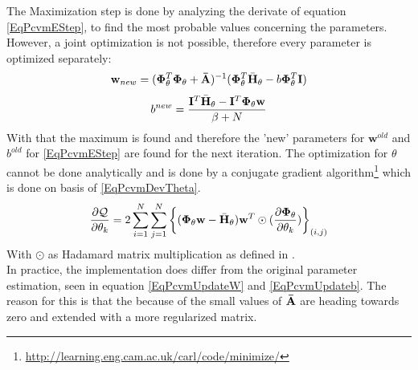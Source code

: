 The Maximization step is done by analyzing the derivate of equation \ref{EqPcvmEStep}, to find the most probable values concerning the parameters.
However, a joint optimization is not possible, therefore every parameter is optimized separately:\cite{Chen.2009}
\begin{equation}\label{EqPcvmUpdateW}
\mathbf{w}_{new} = (\mathbf{\Phi}_\theta^T \mathbf{\Phi}_\theta + \mathbf{\bar{A}})^{-1} (\mathbf{\Phi}_\theta^T \bar{\mathbf{H}}_\theta - b\mathbf{\Phi}_\theta^T \mathbf{I})
\end{equation}
\begin{equation}\label{EqPcvmUpdateb}
b^{new} = \frac{\mathbf{I}^T \bar{\mathbf{H}}_\theta - \mathbf{I}^T \mathbf{\Phi}_\theta \mathbf{w}}{\beta + N}
\end{equation}
With that the maximum is found and therefore the 'new' parameters for $\mathbf{w}^{old}$ and $b^{old}$ for \ref{EqPcvmEStep} are found for the next iteration.
The optimization for $\theta$ cannot be done analytically and is done by a conjugate gradient algorithm\footnote{\url{http://learning.eng.cam.ac.uk/carl/code/minimize/}} which is done on basis of \eqref{EqPcvmDevTheta}.\cite{Chen.2009}
\begin{equation}\label{EqPcvmDevTheta}
\frac{\partial \mathcal{Q}}{\partial \mathbf{\theta}_k } = 2 \sum_{i=1}^{N}\sum_{j=1}^{N} \bigg\{ (\mathbf{\Phi}_\theta \mathbf{w} - \bar{\mathbf{H}}_\theta) \mathbf{w}^T \odot (\frac{\partial\mathbf{\Phi}_\theta}{\partial \theta_k} ) \bigg\}_{(i,j)}
\end{equation}
With $\odot$ as Hadamard matrix multiplication as defined in \cite{CaroLopera.2012}.\\
In practice, the implementation does differ from the original parameter estimation, seen in equation \ref{EqPcvmUpdateW} and \ref{EqPcvmUpdateb}. 
The reason for this is that the because of the small values of $\mathbf{\bar{A}}$ are heading towards zero and extended with a more regularized matrix.\cite{Chen.2009} 

